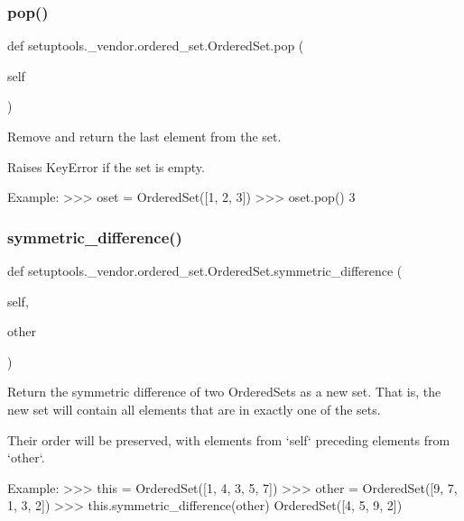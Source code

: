 \subsubsection{\texorpdfstring{pop()}{pop()}}
{\footnotesize\ttfamily def setuptools.\+\_\+vendor.\+ordered\+\_\+set.\+Ordered\+Set.\+pop (\begin{DoxyParamCaption}\item[{}]{self }\end{DoxyParamCaption})}

\begin{DoxyVerb}Remove and return the last element from the set.

Raises KeyError if the set is empty.

Example:
    >>> oset = OrderedSet([1, 2, 3])
    >>> oset.pop()
    3
\end{DoxyVerb}
 \mbox{\label{classsetuptools_1_1__vendor_1_1ordered__set_1_1OrderedSet_a3cb605fe96c3dd88b27099de9ac919d4}} 
\subsubsection{\texorpdfstring{symmetric\+\_\+difference()}{symmetric\_difference()}}
{\footnotesize\ttfamily def setuptools.\+\_\+vendor.\+ordered\+\_\+set.\+Ordered\+Set.\+symmetric\+\_\+difference (\begin{DoxyParamCaption}\item[{}]{self,  }\item[{}]{other }\end{DoxyParamCaption})}

\begin{DoxyVerb}Return the symmetric difference of two OrderedSets as a new set.
That is, the new set will contain all elements that are in exactly
one of the sets.

Their order will be preserved, with elements from `self` preceding
elements from `other`.

Example:
    >>> this = OrderedSet([1, 4, 3, 5, 7])
    >>> other = OrderedSet([9, 7, 1, 3, 2])
    >>> this.symmetric_difference(other)
    OrderedSet([4, 5, 9, 2])
\end{DoxyVerb}
 \mbox{\label{classsetuptools_1_1__vendor_1_1ordered__set_1_1OrderedSet_a52a023f956d56fc4cead0069a91e4e1a}} 

